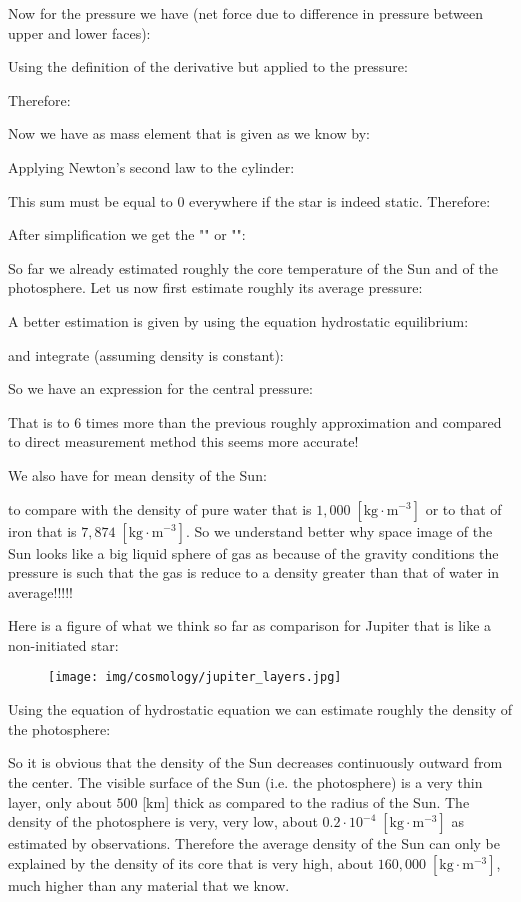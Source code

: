 	Now for the pressure we have (net force due to difference in pressure between upper and lower faces):
	
	Using the definition of the derivative but applied to the pressure:
	
	Therefore:
	
	Now we have as mass element that is given as we know by:
	
	Applying Newton's second law to the cylinder:
	
	This sum must be equal to $0$ everywhere if the star is indeed static. Therefore:
	
	After simplification we get the "" or "":
	
	So far we already estimated roughly the core temperature of the Sun and of the photosphere. Let us now first estimate roughly its average pressure:
	
	A better estimation is given by using the equation hydrostatic equilibrium:
	
	and integrate (assuming density is constant):
	
	So we have an expression for the central pressure:
	
	That is to $6$ times more than the previous roughly approximation and compared to direct measurement method this seems more accurate!
	
	We also have for mean density of the Sun:
	
	to compare with the density of pure water that is $1,000 \; [\text{kg}\cdot \text{m}^{-3}]$ or to that of iron that is $7,874 \; [\text{kg}\cdot \text{m}^{-3}]$. So we understand better why space image of the Sun looks like a big liquid sphere of gas as because of the gravity conditions the pressure is such that the gas is reduce to a density greater than that of water in average!!!!!
	
	Here is a figure of what we think so far as comparison for Jupiter that is like a non-initiated star:
	\begin{figure}[H]
		\centering
		\texttt{[image: img/cosmology/jupiter\_layers.jpg]}	
	\end{figure}
	
	Using the equation of hydrostatic equation we can estimate roughly the density of the photosphere:
	
	So it is obvious that the density of the Sun decreases continuously outward from the center. The visible surface of the Sun (i.e. the photosphere) is a very thin layer, only about $500$ [km] thick as compared to the radius of the Sun. The density of the photosphere is very, very low, about $0.2\cdot 10^{-4} \;[\text{kg}\cdot \text{m}^{-3}]$ as estimated by observations. Therefore the average density of the Sun can only be explained by the density of its core that is very high, about $160,000\;[\text{kg}\cdot\text{m}^{-3}]$, much higher than any material that we know.

